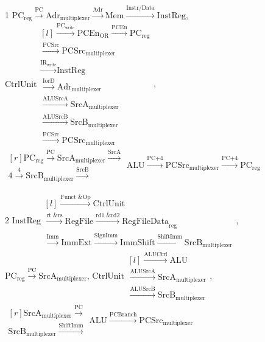 \documentclass{article}
\begin{document}
\begin{enumerate}
1 $\text{PC}_\text{reg} \xrightarrow{\text{PC}} \text{Adr}_\text{multiplexer} \xrightarrow{\text{Adr}} \text{Mem} \xrightarrow{\text{Instr/Data}} \text{InstReg}$, $\text{CtrlUnit} \begin{matrix*}[l] 
\xrightarrow{\text{PC}_\text{write}} \text{PCEn}_\text{OR} \xrightarrow{\text{PCEn}} \text{PC}_\text{reg} \\ 
\xrightarrow{\text{PCSrc}} \text{PCSrc}_\text{multiplexer} \\
\xrightarrow{\text{IR}_\text{write}} \text{InstReg} \\
\xrightarrow{\text{IorD}} \text{Adr}_\text{multiplexer} \\ \xrightarrow{\text{ALUSrcA}} \text{SrcA}_\text{multiplexer} \\ \xrightarrow{\text{ALUSrcB}} \text{SrcB}_\text{multiplexer} \\ \xrightarrow{\text{PCSrc}} \text{PCSrc}_\text{multiplexer} \end{matrix*}$,\\ $\begin{matrix*}[r] \text{PC}_\text{reg} \xrightarrow{\text{PC}} \text{SrcA}_\text{multiplexer} \xrightarrow{\text{SrcA}} \\ \text{4} \xrightarrow{\text{4}} \text{SrcB}_\text{multiplexer} \xrightarrow{\text{SrcB}}\end{matrix*} \text{ALU} \xrightarrow{\text{PC+4}} \text{PCSrc}_\text{multiplexer} \xrightarrow{\text{PC+4}} \text{PC}_\text{reg}$\\

\bigbreak

2 $\text{InstReg} \begin{matrix*}[l] 
\xrightarrow{\text{Funct \& Op}} \text{CtrlUnit} \\ \xrightarrow{\text{rt \& rs}} \text{RegFile} \xrightarrow{\text{rd1 \& rd2}} \text{RegFileData}_\text{reg}\\
\xrightarrow{\text{Imm}} \text{ImmExt} \xrightarrow{\text{SignImm}} \text{ImmShift} \xrightarrow{\text{ShiftImm}} \text{SrcB}_\text{multiplexer} \end{matrix*}$, $\text{PC}_\text{reg} \xrightarrow{\text{PC}} \text{SrcA}_\text{multiplexer}$,
\smallbreak
$\text{CtrlUnit} \begin{matrix*}[l] 
\xrightarrow{\text{ALUCtrl}} \text{ALU} \\ \xrightarrow{\text{ALUSrcA}} \text{SrcA}_\text{multiplexer} \\ \xrightarrow{\text{ALUSrcB}} \text{SrcB}_\text{multiplexer} \end{matrix*}$, $\begin{matrix*}[r] \text{SrcA}_\text{multiplexer} \xrightarrow{\text{PC}} \\  \text{SrcB}_\text{multiplexer} \xrightarrow{\text{ShiftImm}}\end{matrix*} \text{ALU} \xrightarrow{\text{PCBranch}} \text{PCSrc}_\text{multiplexer}$\\


\end{enumerate}
\end{document}
